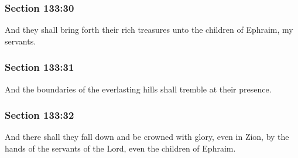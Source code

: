 	\subsubsection{Section 133:30} %
		\label{DC133-30}

		And they shall bring forth their rich treasures unto the children of Ephraim, my servants.


	\subsubsection{Section 133:31} %
		\label{DC133-31}

		And the boundaries of the everlasting hills shall tremble at their presence.


	\subsubsection{Section 133:32} %
		\label{DC133-32}

		And there shall they fall down and be crowned with glory, even in Zion, by the hands of the servants of the Lord, even the children of Ephraim.


